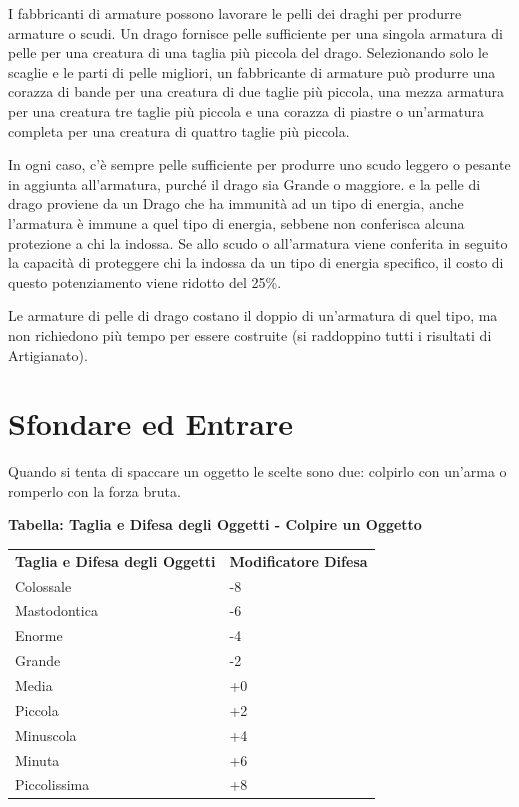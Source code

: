 \documentclass[a4paper,11pt,twoside,openany]{book}
\begin{document}
I fabbricanti di armature possono lavorare le pelli dei draghi per produrre armature o scudi.
Un drago fornisce pelle sufficiente per una singola armatura di pelle per una creatura di una taglia più piccola del drago. Selezionando solo le scaglie e le parti di pelle migliori, un fabbricante di armature può produrre una corazza di bande per una creatura di due taglie più piccola, una mezza armatura per una creatura tre taglie più piccola e una corazza di piastre o un'armatura completa per una creatura di quattro taglie più piccola.

In ogni caso, c'è sempre pelle sufficiente per produrre uno scudo leggero o pesante in aggiunta all'armatura, purché il drago sia Grande o maggiore.
e la pelle di drago proviene da un Drago che ha immunità ad un tipo di energia, anche l'armatura è immune a quel tipo di energia, sebbene non conferisca alcuna protezione a chi la indossa. Se allo scudo o all'armatura viene conferita in seguito la capacità di proteggere chi la indossa da un tipo di energia specifico, il costo di questo potenziamento viene ridotto del 25\%.

Le armature di pelle di drago costano il doppio di un'armatura di quel tipo, ma non richiedono più tempo per essere costruite (si raddoppino tutti i risultati di Artigianato).

\pagebreak

\section{Sfondare ed Entrare}

\label{sfondare-ed-entrare}

Quando si tenta di spaccare un oggetto le scelte sono due: colpirlo con un'arma o romperlo con la forza bruta.

\textbf{Tabella: Taglia e Difesa degli Oggetti - Colpire un Oggetto}
\medskip

\begin{tabular}{ll}
	\toprule
	\textbf{Taglia e Difesa degli Oggetti} & \textbf{Modificatore Difesa}\\
	Colossale                              & -8\\
	Mastodontica                           & -6\\
	Enorme                                 & -4\\
	Grande                                 & -2\\
	Media                                  & +0\\
	Piccola                                & +2\\
	Minuscola                              & +4\\
	Minuta                                 & +6\\
	Piccolissima                           & +8\\
\end{tabular}
\end{document}
